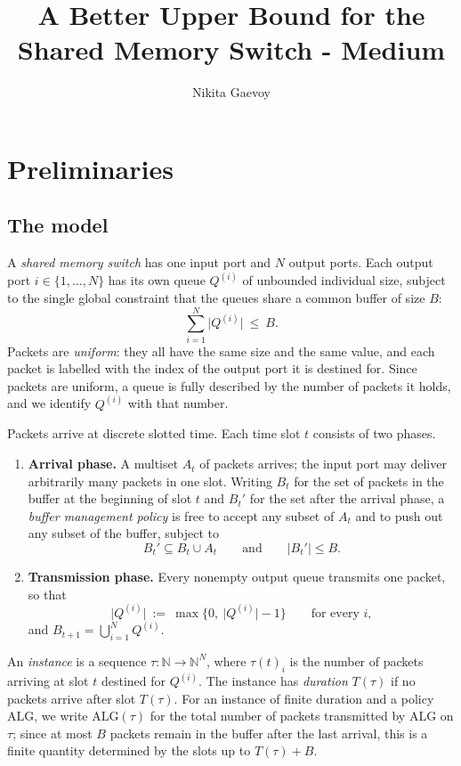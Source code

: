 \documentclass[10pt]{article}
\title{A Better Upper Bound for the Shared Memory Switch - Medium}
\author{Nikita Gaevoy}
\date{}
\newcommand{\ALG}{\text{ALG}}
\begin{document}
\maketitle

\section{Preliminaries}

\subsection{The model}

A \emph{shared memory switch} has one input port and $N$ output ports. Each
output port $i\in\{1,\ldots,N\}$ has its own queue $Q^{(i)}$ of unbounded
individual size, subject to the single global constraint that the queues share
a common buffer of size $B$:
\[
\sum_{i=1}^{N}\bigl|Q^{(i)}\bigr|\ \le\ B .
\]
Packets are \emph{uniform}: they all have the same size and the same value, and
each packet is labelled with the index of the output port it is destined for.
Since packets are uniform, a queue is fully described by the number of packets
it holds, and we identify $Q^{(i)}$ with that number.

Packets arrive at discrete slotted time. Each time slot $t$ consists of two
phases.
\begin{enumerate}
    \item \textbf{Arrival phase.} A multiset $A_t$ of packets arrives; the
    input port may deliver arbitrarily many packets in one slot. Writing $B_t$
    for the set of packets in the buffer at the beginning of slot $t$ and
    $B_t'$ for the set after the arrival phase, a \emph{buffer management
    policy} is free to accept any subset of $A_t$ and to push out any subset of
    the buffer, subject to
    \[
    B_t'\subseteq B_t\cup A_t
    \qquad\text{and}\qquad
    |B_t'|\le B .
    \]
    \item \textbf{Transmission phase.} Every nonempty output queue transmits
    one packet, so that
    \[
    \bigl|Q^{(i)}\bigr|
    \ :=\
    \max\bigl\{0,\ \bigl|Q^{(i)}\bigr|-1\bigr\}
    \qquad\text{for every } i,
    \]
    and $B_{t+1}=\bigcup_{i=1}^{N}Q^{(i)}$.
\end{enumerate}

An \emph{instance} is a sequence $\tau:\mathbb{N}\to\mathbb{N}^{N}$, where
$\tau(t)_i$ is the number of packets arriving at slot $t$ destined for
$Q^{(i)}$. The instance has \emph{duration} $T(\tau)$ if no packets arrive
after slot $T(\tau)$. For an instance of finite duration and a policy $\ALG$,
we write $\ALG(\tau)$ for the total number of packets transmitted by $\ALG$ on
$\tau$; since at most $B$ packets remain in the buffer after the last arrival,
this is a finite quantity determined by the slots up to $T(\tau)+B$.
\end{document}
